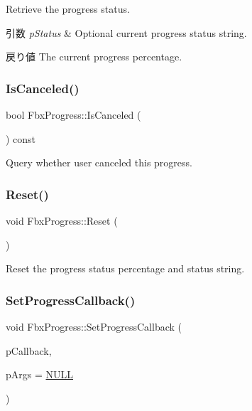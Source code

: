 Retrieve the progress status. 
\begin{DoxyParams}{引数}
{\em p\+Status} & Optional current progress status string. \\
\hline
\end{DoxyParams}
\begin{DoxyReturn}{戻り値}
The current progress percentage. 
\end{DoxyReturn}
\mbox{\label{class_fbx_progress_a01a1707ca7bdb12250642661ac1a3a31}} 
\subsubsection{\texorpdfstring{Is\+Canceled()}{IsCanceled()}}
{\footnotesize\ttfamily bool Fbx\+Progress\+::\+Is\+Canceled (\begin{DoxyParamCaption}{ }\end{DoxyParamCaption}) const}



Query whether user canceled this progress. 

\mbox{\label{class_fbx_progress_a5f7149e7ac9e7dd29eae9f3ebada5418}} 
\subsubsection{\texorpdfstring{Reset()}{Reset()}}
{\footnotesize\ttfamily void Fbx\+Progress\+::\+Reset (\begin{DoxyParamCaption}{ }\end{DoxyParamCaption})}



Reset the progress status percentage and status string. 

\mbox{\label{class_fbx_progress_a8d165798c9c75bdf2498d7a6840220aa}} 
\subsubsection{\texorpdfstring{Set\+Progress\+Callback()}{SetProgressCallback()}}
{\footnotesize\ttfamily void Fbx\+Progress\+::\+Set\+Progress\+Callback (\begin{DoxyParamCaption}\item[{\hyperlink{fbxprogress_8h_a3765040904b462fb1f2673caba3488db}{Fbx\+Progress\+Callback}}]{p\+Callback,  }\item[{void $\ast$}]{p\+Args = {\ttfamily \hyperlink{fbxarch_8h_a070d2ce7b6bb7e5c05602aa8c308d0c4}{N\+U\+LL}} }\end{DoxyParamCaption})}

